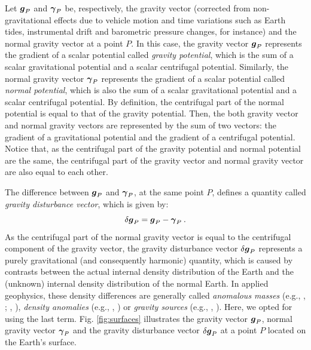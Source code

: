 \documentclass[extra]{gji}
\begin{document}
Let $\mitbf{g}_{P}$ and $\mitbf{\gamma}_{P}$ be, respectively, the
gravity vector (corrected from non-gravitational effects due to vehicle
motion and time variations such as Earth tides, instrumental drift and
barometric pressure changes, for instance) and the normal gravity vector
at a point $P$.
In this case, the gravity vector $\mitbf{g}_{P}$ represents the
gradient of a scalar potential called \textit{gravity potential},
which is the sum of a scalar gravitational potential and a
scalar centrifugal potential.
Similarly, the normal gravity vector $\mitbf{\gamma}_{P}$ represents the
gradient of a scalar potential called \textit{normal potential},
which is also the sum of a scalar gravitational potential and a
scalar centrifugal potential.
By definition, the centrifugal part of the normal potential is equal
to that of the gravity potential.
Then, the both gravity vector and normal gravity vectors are represented
by the sum of two vectors: the gradient of a gravitational potential and
the gradient of a centrifugal potential. Notice that, as the centrifugal
part of the gravity potential and normal potential are the same, the
centrifugal part of the gravity vector and normal gravity vector are
also equal to each other.

The difference between $\mitbf{g}_{P}$ and $\mitbf{\gamma}_{P}$, at the same
point $P$, defines a quantity called \textit{gravity disturbance
vector}, which is given by:
\begin{equation}
\delta \mitbf{g}_{P} =
\mitbf{g}_{P} - \mitbf{\gamma}_{P} \: .
\label{eq:gravity-disturbance-vector}
\end{equation}
As the centrifugal part of the normal gravity vector
is equal to the centrifugal component of the gravity vector,
the gravity disturbance vector $\delta \mitbf{g}_{P}$ represents
a purely gravitational (and consequently harmonic) quantity, which is
caused by contrasts between the actual internal
density distribution of the Earth and the (unknown) internal density
distribution of the normal Earth.
In applied geophysics, these density differences are generally
called \textit{anomalous masses} (e.g., \citeauthor{hammer1945},
\citeyear{hammer1945}; \citeauthor{lafehr1965}, \citeyear{lafehr1965}),
\textit{density anomalies} (e.g., \citeauthor{forsberg1984},
\citeyear{forsberg1984}) or \textit{gravity sources} (e.g.,
\citeauthor{blakely1996}, \citeyear{blakely1996}). Here, we opted for
using the last term.
Fig. \ref{fig:surfaces} illustrates the gravity vector
$\mitbf{g}_{P}$, normal gravity vector $\mitbf{\gamma}_{P}$ and
the gravity disturbance vector $\delta \mitbf{g}_{P}$ at a point $P$
located on the Earth's surface.
\end{document}
